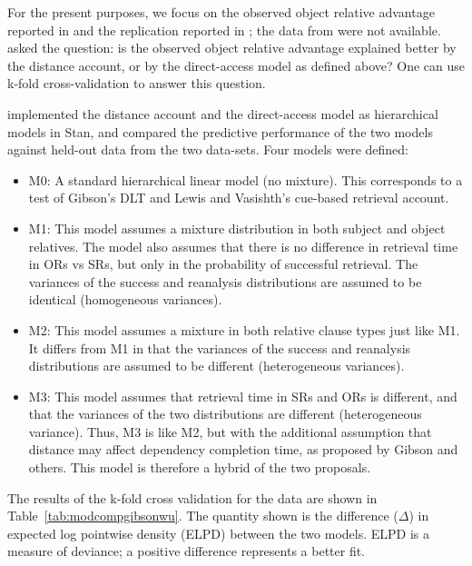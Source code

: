 \documentclass{cambridge7A}\usepackage[]{graphicx}\usepackage[]{color}
\begin{document}
For the present purposes, we focus on the observed object relative advantage reported in \cite{gibsonwu} and the replication reported in \cite{VasishthetalPLoSOne2013}; the data from \cite{HsiaoGibson2003} were not available. \cite{VasishthChopinRyderNicenboimCogSci2017}  asked the question: is the observed  object relative advantage explained better by the distance account, or  by the direct-access model as defined above? One can use k-fold cross-validation  to answer this question.

\cite{VasishthChopinRyderNicenboimCogSci2017} implemented the distance account and the direct-access model as hierarchical models in  Stan, and compared the predictive performance of the two models against held-out data from the two data-sets. Four models were defined:

\begin{itemize}
\item M0: A standard hierarchical linear model (no mixture). This corresponds to a test of Gibson's DLT and Lewis and Vasishth's cue-based retrieval account.
\item M1: This model assumes a mixture distribution in both subject and object relatives. The model also assumes
that there is no difference in retrieval time in ORs vs SRs, but only in the probability of successful retrieval. The variances of the success and reanalysis distributions are assumed to be identical (homogeneous variances). 
\item M2: This model assumes a mixture in both relative clause types just like M1. It differs from M1 in that the variances of the success and reanalysis distributions are assumed to be different (heterogeneous variances).
\item M3: This model assumes that retrieval time in SRs and ORs is different, and that the variances of the two distributions are different (heterogeneous variance). Thus, M3 is like M2, but with the additional assumption that distance may affect dependency completion time, as proposed by Gibson and others. This model is therefore a hybrid of the two proposals.
\end{itemize}

The results of the k-fold cross validation for the \cite{gibsonwu} data are shown in Table~\ref{tab:modcompgibsonwu}. The quantity shown is the difference ($\Delta$) in expected log pointwise density (ELPD) between the two models. ELPD is  a measure of deviance; a positive  difference represents a better fit.
\end{document}
